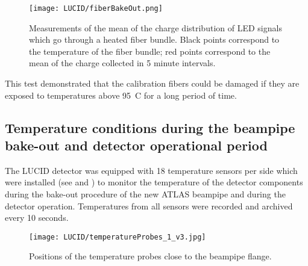 \begin{figure}
\centering
\texttt{[image: LUCID/fiberBakeOut.png]}
\caption{Measurements of the mean of the charge distribution of LED signals which go through a heated fiber bundle.
Black points correspond to the temperature of the fiber bundle; red points correspond to the mean of the charge collected in 5 minute intervals.}
\label{fig:fiberBakeOut}
\end{figure}

This test demonstrated that the calibration fibers could be damaged if they are exposed 
to temperatures above 95\degree~C for a long period of time.
% 
% 
 
\subsection{Temperature conditions during the beampipe bake-out and detector operational period}

The LUCID detector was equipped with 18 temperature sensors per side which were installed (see 
and )
to monitor the temperature of the detector components during the bake-out procedure of the new ATLAS beampipe and during the detector operation.
Temperatures from all sensors were recorded and archived every 10 seconds.

\begin{figure}
\centering
\texttt{[image: LUCID/temperatureProbes\_1\_v3.jpg]}
\caption{Positions of the temperature probes close to the beampipe flange.}
\label{fig:TempProbes1}
\end{figure}

